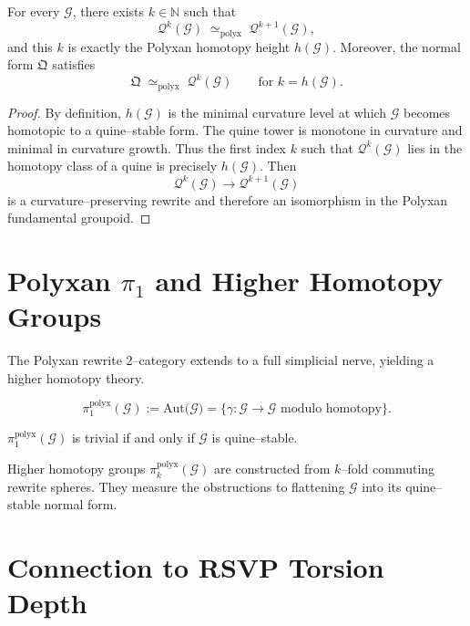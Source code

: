 \begin{theorem}
\label{thm:27-hoq}
For every $\mathcal{G}$, there exists $k\in\mathbb{N}$ such that
\[
\mathcal{Q}^k(\mathcal{G})
  \;\simeq_{\mathrm{polyx}}\;
\mathcal{Q}^{k+1}(\mathcal{G}),
\]
and this $k$ is exactly the Polyxan homotopy height $h(\mathcal{G})$.
Moreover, the normal form $\mathfrak{Q}$ satisfies
\[
\mathfrak{Q} \;\simeq_{\mathrm{polyx}}\; \mathcal{Q}^k(\mathcal{G})
\qquad\text{for } k = h(\mathcal{G}).
\]
\end{theorem}

\begin{proof}
By definition, $h(\mathcal{G})$ is the minimal curvature level at which
$\mathcal{G}$ becomes homotopic to a quine--stable form.
The quine tower is monotone in curvature and minimal in curvature growth.
Thus the first index $k$ such that
$\mathcal{Q}^k(\mathcal{G})$ lies in the homotopy class of a quine
is precisely $h(\mathcal{G})$.
Then
\[
\mathcal{Q}^k(\mathcal{G}) \to \mathcal{Q}^{k+1}(\mathcal{G})
\]
is a curvature--preserving rewrite and therefore an isomorphism in the
Polyxan fundamental groupoid.
\end{proof}

\section{Polyxan \texorpdfstring{$\pi_1$}{π1} and Higher Homotopy Groups}

The Polyxan rewrite 2--category extends to a full simplicial nerve,
yielding a higher homotopy theory.

\begin{definition}
\[
\pi_1^{\mathrm{polyx}}(\mathcal{G})
  := \mathrm{Aut}\bigl(\mathcal{G}\bigr)
   = \{\gamma : \mathcal{G}\to\mathcal{G} \text{ modulo homotopy}\}.
\]
\end{definition}

\begin{proposition}
$\pi_1^{\mathrm{polyx}}(\mathcal{G})$ is trivial if and only if
$\mathcal{G}$ is quine--stable.
\end{proposition}

Higher homotopy groups $\pi_k^{\mathrm{polyx}}(\mathcal{G})$ are constructed
from $k$--fold commuting rewrite spheres.
They measure the obstructions to flattening $\mathcal{G}$ into
its quine--stable normal form.

\section{Connection to RSVP Torsion Depth}

